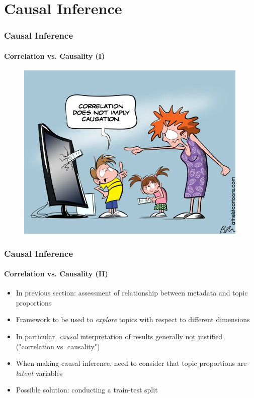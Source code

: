 \documentclass[xcolor=dvipsnames]{beamer}
\begin{document}
\section{Causal Inference}
\begin{frame}
\frametitle{Causal Inference}
\framesubtitle{Correlation vs. Causality (I)}
	\begin{figure}[h!]
  	\centering
  	\includegraphics[scale = 0.50]{../plots/presentation/correlation_causality.png}
	\end{figure}
\end{frame}

\begin{frame}
\frametitle{Causal Inference}
\framesubtitle{Correlation vs. Causality (II)}
\begin{itemize}
\item In previous section: assessment of relationship between metadata and topic proportions
\item Framework to be used to \textit{explore} topics with respect to different dimensions
\item In particular, \textit{causal} interpretation of results generally not justified ("correlation vs. causality")
\item When making causal inference, need to consider that topic proportions are \textit{latent} variables 
\item Possible solution: conducting a train-test split
\end{itemize}
\end{frame}
\end{document}
